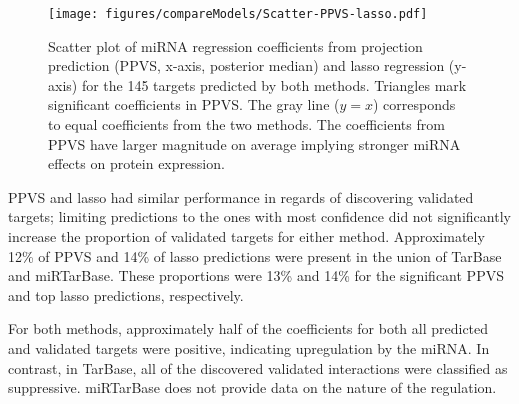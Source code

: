 \begin{figure}[htb]
  \centering
  \texttt{[image: figures/compareModels/Scatter-PPVS-lasso.pdf]}
  \caption{Scatter plot of miRNA regression coefficients from projection
  prediction (PPVS, x-axis, posterior median) and lasso regression (y-axis) for the 145 targets predicted by both methods.
  Triangles mark significant coefficients in PPVS. The gray line ($y=x$) corresponds to
  equal coefficients from the two methods. The coefficients from PPVS have
  larger magnitude on average implying stronger miRNA effects on protein expression.
  }
  \label{fig:scatter-ppvs-lasso}
\end{figure}

PPVS and lasso had similar performance in regards of discovering validated
targets; limiting predictions to the ones with most confidence did not
significantly increase the proportion of validated targets for either method.
Approximately 12\% of PPVS and 14\% of lasso predictions were present in the
union of TarBase and miRTarBase. These proportions were 13\% and 14\% for the
significant PPVS and top lasso predictions, respectively.

For both methods, approximately half of the coefficients for both all
predicted and validated targets were positive, indicating upregulation by the
miRNA. In contrast, in TarBase, all of the discovered validated interactions
were classified as suppressive. miRTarBase does not provide data on the
nature of the regulation.
